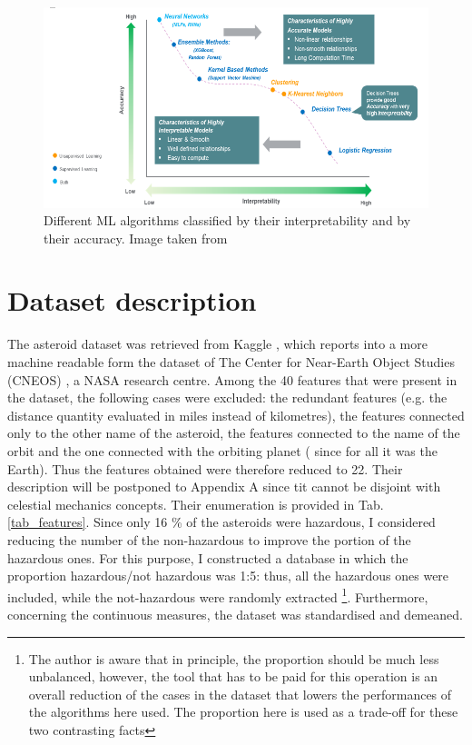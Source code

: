 \documentclass[12pt,%
               a4paper,%
               oneside,openany,%
               titlepage,%
               headinclude,footinclude,%
               BCOR5mm,%
               cleardoublepage=empty,%
               tablecaptionabove,%
               floatperchapter,
               ]{scrreprt}                 %
\begin{document}
\begin{figure}[h]
\begin{center}
\includegraphics[width=1\textwidth]{Figures/ML_intepretability.png}
\caption{Different ML algorithms classified by their interpretability and by their accuracy. Image taken from \cite{ml_interpretability}}
\label{ML_intepretability}
\end{center}
\end{figure}


\chapter{Dataset description}

The asteroid dataset was retrieved from Kaggle \cite{kaggle_dataset}, which reports into a more machine readable form the dataset of The Center for Near-Earth Object Studies (CNEOS) \cite{cneos+nasa}, a NASA research centre. Among the 40 features that were present in the dataset,  the following cases were excluded: the redundant features (e.g. the distance quantity evaluated in miles instead of kilometres), the features connected only to the other name of the asteroid, the features connected to the name of the orbit and the one connected with the orbiting planet ( since for all it was the Earth). Thus the features obtained were therefore reduced to 22. Their description will be postponed to Appendix A since tit cannot be disjoint with celestial mechanics concepts. Their enumeration is provided in Tab. \ref{tab_features}. Since only 16 \% of the asteroids were hazardous, I considered reducing the number of the non-hazardous to improve the portion of the hazardous ones. For this purpose, I constructed a database in which the proportion hazardous/not hazardous was 1:5: thus, all the hazardous ones were included, while the not-hazardous were randomly extracted \footnote{The author is aware that in principle, the proportion should be much less unbalanced, however, the tool that has to be paid for this operation is an overall reduction of the cases in the dataset that lowers the performances of the algorithms here used. The proportion here is used as a trade-off for these two contrasting facts}. Furthermore, concerning the continuous measures, the dataset was standardised and demeaned. 
\end{document}
